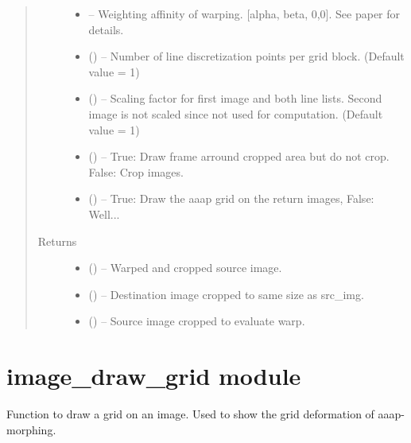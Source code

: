 \documentclass[letterpaper,10pt,english]{sphinxmanual}
\begin{document}
\begin{fulllineitems}
\begin{quote}
\begin{description}
\begin{itemize}
\item {} 
 -- Weighting affinity of warping.
{[}alpha, beta, 0,0{]}. See paper for details.

\item {} 
 () -- Number of line discretization points per grid block.
(Default value = 1)

\item {} 
 () -- Scaling factor for first image and both line lists.
Second image is not scaled since not used for computation.
(Default value = 1)

\item {} 
 () -- True: Draw frame arround cropped area but do not crop.
False: Crop images.

\item {} 
 () -- True: Draw the aaap grid on the return images, False: Well...

\end{itemize}

\item[{Returns}] \leavevmode
\begin{itemize}
\item {} 
 () -- Warped and cropped source image.

\item {} 
 () -- Destination image cropped to same size as src\_img.

\item {} 
 () -- Source image cropped to evaluate warp.

\end{itemize}


\end{description}\end{quote}

\end{fulllineitems}



\chapter{image\_draw\_grid module}
\label{\detokenize{image_draw_grid:image-draw-grid-module}}\label{\detokenize{image_draw_grid::doc}}\label{\detokenize{image_draw_grid:module-image_draw_grid}}
Function to draw a grid on an image. Used to show the grid deformation of
aaap-morphing.
\end{document}
